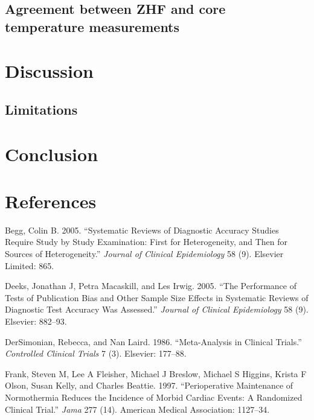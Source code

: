 \documentclass[smallextended]{svjour3}       %
\begin{document}
\hypertarget{agreement-between-zhf-and-core-temperature-measurements}{%
\subsection{Agreement between ZHF and core temperature
measurements}\label{agreement-between-zhf-and-core-temperature-measurements}}

\hypertarget{discussion}{%
\section{Discussion}\label{discussion}}

\hypertarget{limitations}{%
\subsection{Limitations}\label{limitations}}

\hypertarget{conclusion}{%
\section{Conclusion}\label{conclusion}}

\hypertarget{references}{%
\section*{References}\label{references}}

\hypertarget{refs}{}
\leavevmode\hypertarget{ref-begg2005systematic}{}%
Begg, Colin B. 2005. ``Systematic Reviews of Diagnostic Accuracy Studies
Require Study by Study Examination: First for Heterogeneity, and Then
for Sources of Heterogeneity.'' \emph{Journal of Clinical Epidemiology}
58 (9). Elsevier Limited: 865.

\leavevmode\hypertarget{ref-deeks2005performance}{}%
Deeks, Jonathan J, Petra Macaskill, and Les Irwig. 2005. ``The
Performance of Tests of Publication Bias and Other Sample Size Effects
in Systematic Reviews of Diagnostic Test Accuracy Was Assessed.''
\emph{Journal of Clinical Epidemiology} 58 (9). Elsevier: 882--93.

\leavevmode\hypertarget{ref-dersimonian1986meta}{}%
DerSimonian, Rebecca, and Nan Laird. 1986. ``Meta-Analysis in Clinical
Trials.'' \emph{Controlled Clinical Trials} 7 (3). Elsevier: 177--88.

\leavevmode\hypertarget{ref-frank1997perioperative}{}%
Frank, Steven M, Lee A Fleisher, Michael J Breslow, Michael S Higgins,
Krista F Olson, Susan Kelly, and Charles Beattie. 1997. ``Perioperative
Maintenance of Normothermia Reduces the Incidence of Morbid Cardiac
Events: A Randomized Clinical Trial.'' \emph{Jama} 277 (14). American
Medical Association: 1127--34.
\end{document}
